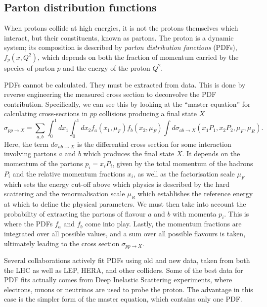\documentclass[10pt,a4paper]{book}
\begin{document}
\subsection{Parton distribution functions}
When protons collide at high energies, it is not the protons themselves which interact, but their constituents, known as partons. The proton is a dynamic system; its composition is described by \emph{parton distribution functions} (PDFs), $f_p(x,Q^2)$, which depends on both the fraction of momentum carried by the species of parton $p$ and the energy of the proton $Q^2$.

PDFs cannot be calculated. They must be extracted from data. This is done by reverse engineering the measured cross section to deconvolve the PDF contribution. Specifically, we can see this by looking at the ``master equation'' for calculating cross-sections in $pp$ collisions producing a final state $X$
\begin{equation}
    \sigma_{pp\rightarrow X} = \sum_{a,b} \int_0^1 dx_1 \int_0^1 dx_2 f_a(x_1, \mu_F)f_b(x_2,\mu_F)\int d\sigma_{ab \rightarrow X} (x_1P_1, x_2P_2, \mu_F, \mu_R).
\end{equation}
Here, the term $d\sigma_{ab\rightarrow X}$ is the differential cross section for some interaction involving partons $a$ and $b$ which produces the final state $X$. It depends on the momentum of the partons $p_{i} = x_{i}P_i$, given by the total momentum of the hadrons $P_i$ and the relative momentum fractions $x_i$, as well as the factorisation scale $\mu_F$ which sets the energy cut-off above which physics is described by the hard scattering and the renormalisation scale $\mu_R$ which establishes the reference energy at which to define the physical parameters. We must then take into account the probability of extracting the partons of flavour $a$ and $b$ with momenta $p_i$. This is where the PDFs $f_a$ and $f_b$ come into play. Lastly, the momentum fractions are integrated over all possible values, and a sum over all possible flavours is taken, ultimately leading to the cross section $\sigma_{pp\rightarrow X}$. 

Several collaborations actively fit PDFs using old and new data, taken from both the LHC as well as LEP, HERA, and other colliders. Some of the best data for PDF fits actually comes from Deep Inelastic Scattering experiments, where electrons, muons or neutrinos are used to probe the proton. The advantage in this case is the simpler form of the master equation, which contains only one PDF. 
\end{document}
